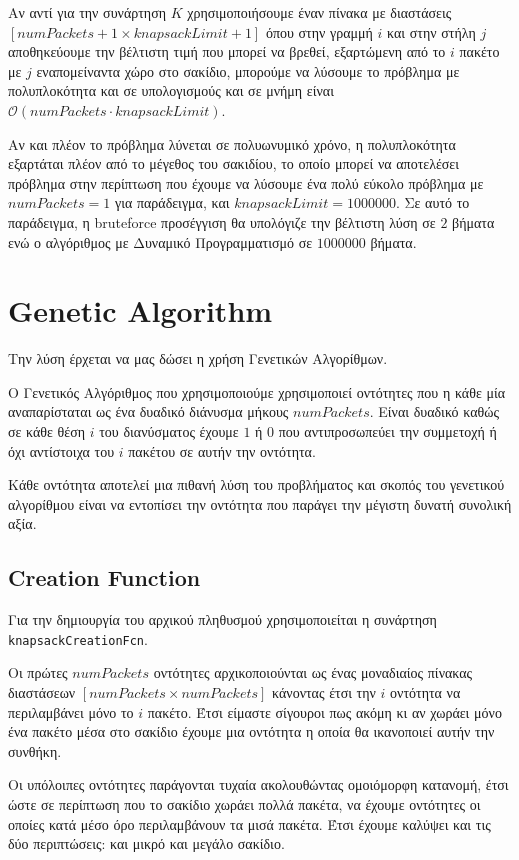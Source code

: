 \documentclass{article}
\begin{document}
Αν αντί για την συνάρτηση $K$ χρησιμοποιήσουμε έναν πίνακα με διαστάσεις
$\left[numPackets+1 \times knapsackLimit+1\right]$ όπου στην γραμμή $i$ και στην
στήλη $j$ αποθηκεύουμε την βέλτιστη τιμή που μπορεί να βρεθεί, εξαρτώμενη από το
$i$ πακέτο με $j$ εναπομείναντα χώρο στο σακίδιο, μπορούμε να λύσουμε το
πρόβλημα με πολυπλοκότητα και σε υπολογισμούς και σε μνήμη είναι
$\mathcal{O}\left(numPackets \cdot knapsackLimit\right)$.

Αν και πλέον το πρόβλημα λύνεται σε πολυωνυμικό χρόνο, η πολυπλοκότητα εξαρτάται
πλέον από το μέγεθος του σακιδίου, το οποίο μπορεί να αποτελέσει πρόβλημα στην
περίπτωση που έχουμε να λύσουμε ένα πολύ εύκολο πρόβλημα με $numPackets=1$ για
παράδειγμα, και $knapsackLimit=1000000$. Σε αυτό το παράδειγμα, η bruteforce
προσέγγιση θα υπολόγιζε την βέλτιστη λύση σε $2$ βήματα ενώ ο αλγόριθμος με
Δυναμικό Προγραμματισμό σε $1000000$ βήματα.

\section{Genetic Algorithm}

Την λύση έρχεται να μας δώσει η χρήση Γενετικών Αλγορίθμων.

Ο Γενετικός Αλγόριθμος που χρησιμοποιούμε χρησιμοποιεί οντότητες που η κάθε μία
αναπαρίσταται ως ένα δυαδικό διάνυσμα μήκους $numPackets$. Είναι δυαδικό καθώς
σε κάθε θέση $i$ του διανύσματος έχουμε $1$ ή $0$ που αντιπροσωπεύει την
συμμετοχή ή όχι αντίστοιχα του $i$ πακέτου σε αυτήν την οντότητα.

Κάθε οντότητα αποτελεί μια πιθανή λύση του προβλήματος και σκοπός του γενετικού
αλγορίθμου είναι να εντοπίσει την οντότητα που παράγει την μέγιστη δυνατή
συνολική αξία.

\subsection{Creation Function}

Για την δημιουργία του αρχικού πληθυσμού χρησιμοποιείται η συνάρτηση
\verb|knapsackCreationFcn|.

Οι πρώτες $numPackets$ οντότητες αρχικοποιούνται ως ένας μοναδιαίος πίνακας
διαστάσεων $\left[numPackets \times numPackets\right]$ κάνοντας έτσι την $i$
οντότητα να περιλαμβάνει μόνο το $i$ πακέτο. Έτσι είμαστε σίγουροι πως ακόμη κι
αν χωράει μόνο ένα πακέτο μέσα στο σακίδιο έχουμε μια οντότητα η οποία θα
ικανοποιεί αυτήν την συνθήκη.

Οι υπόλοιπες οντότητες παράγονται τυχαία ακολουθώντας ομοιόμορφη κατανομή, έτσι
ώστε σε περίπτωση που το σακίδιο χωράει πολλά πακέτα, να έχουμε οντότητες οι
οποίες κατά μέσο όρο περιλαμβάνουν τα μισά πακέτα. Έτσι έχουμε καλύψει και τις
δύο περιπτώσεις: και μικρό και μεγάλο σακίδιο.
\end{document}
